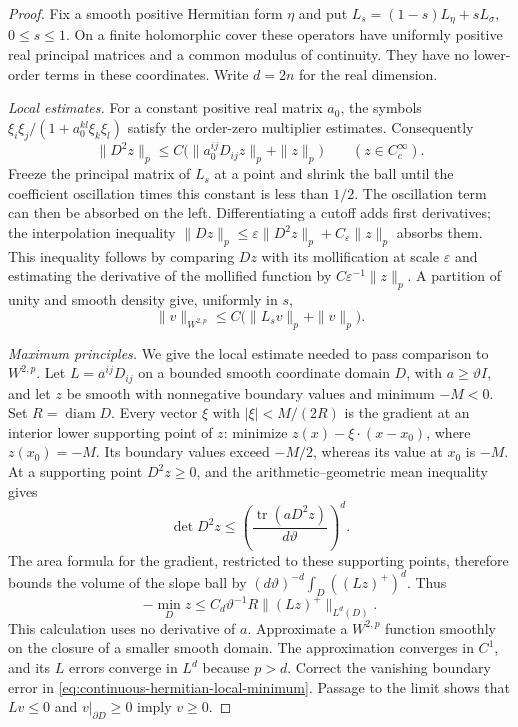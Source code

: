\begin{proof}
Fix a smooth positive Hermitian form $\eta$ and put
$L_s=(1-s)L_\eta+sL_\sigma$, $0\leq s\leq1$. On a finite holomorphic
cover these operators have uniformly positive real principal matrices
and a common modulus of continuity. They have no lower-order terms in
these coordinates. Write $d=2n$ for the real dimension.

\emph{Local estimates.} For a constant positive real matrix $a_0$, the
symbols $\xi_i\xi_j/(1+a_0^{kl}\xi_k\xi_l)$ satisfy the order-zero
multiplier estimates. Consequently
\[
 \|D^2z\|_p\leq C\bigl(\|a_0^{ij}D_{ij}z\|_p+\|z\|_p\bigr)
 \qquad(z\in C_c^\infty).
\]
Freeze the principal matrix of $L_s$ at a point and shrink the ball until
the coefficient oscillation times this constant is less than $1/2$.
The oscillation term can then be absorbed on the left. Differentiating
a cutoff adds first derivatives; the interpolation inequality
$\|Dz\|_p\leq\varepsilon\|D^2z\|_p+C_\varepsilon\|z\|_p$
absorbs them. This inequality follows by comparing $Dz$ with its
mollification at scale $\varepsilon$ and estimating the derivative of
the mollified function by $C\varepsilon^{-1}\|z\|_p$.
A partition of unity and smooth density give, uniformly in $s$,
\begin{equation}\label{eq:continuous-hermitian-wtwo}
 \|v\|_{W^{2,p}}\leq C\bigl(\|L_sv\|_p+\|v\|_p\bigr).
\end{equation}

\emph{Maximum principles.} We give the local estimate needed to pass
comparison to $W^{2,p}$. Let $L=a^{ij}D_{ij}$ on a bounded smooth
coordinate domain $D$, with $a\geq\vartheta I$, and let $z$ be smooth
with nonnegative boundary values and minimum $-M<0$. Set
$R=\operatorname{diam}D$. Every vector $\xi$ with $|\xi|<M/(2R)$ is
the gradient at an interior lower supporting point of $z$: minimize
$z(x)-\xi\cdot(x-x_0)$, where $z(x_0)=-M$. Its boundary values exceed
$-M/2$, whereas its value at $x_0$ is $-M$. At a supporting point
$D^2z\geq0$, and the arithmetic--geometric mean inequality gives
\[
 \det D^2z\leq
 \left(\frac{\operatorname{tr}(aD^2z)}{d\vartheta}\right)^d.
\]
The area formula for the gradient, restricted to these supporting
points, therefore bounds the volume of the slope ball by
$(d\vartheta)^{-d}\int_D((Lz)^+)^d$. Thus
\begin{equation}\label{eq:continuous-hermitian-local-minimum}
 -\min_Dz\leq C_d\vartheta^{-1}R\|(Lz)^+\|_{L^d(D)}.
\end{equation}
This calculation uses no derivative of $a$. Approximate a $W^{2,p}$
function smoothly on the closure of a smaller smooth domain. The
approximation converges in $C^1$, and its $L$ errors converge in $L^d$
because $p>d$. Correct the vanishing boundary error in
\eqref{eq:continuous-hermitian-local-minimum}. Passage to the limit
shows that $Lv\leq0$ and $v|_{\partial D}\geq0$ imply $v\geq0$.


\end{proof}
